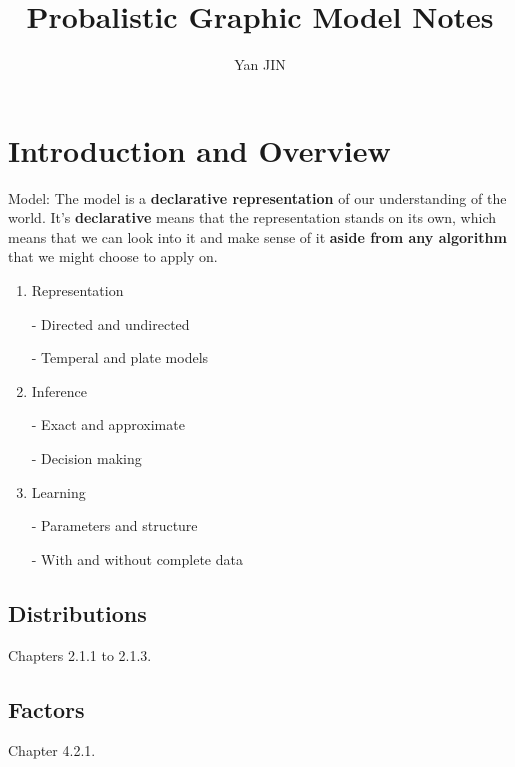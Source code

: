 \documentclass[12pt]{article}
\numberwithin{equation}{section}
\begin{document}
\small
  \renewcommand\figurename{Fig.}
    \title{Probalistic Graphic Model\cite{Coursera}\cite{koller2009probabilistic} Notes}
    \author{Yan JIN}
    \pagestyle{fancy}\fancyhf{}
    \lhead{}
    \lfoot{\textit{}}\cfoot{}\rfoot{\thepage}
    \renewcommand{\headrulewidth}{1.pt}
    \renewcommand{\footrulewidth}{1.pt}
  \maketitle
  
\tableofcontents
\newpage

\section{Introduction and Overview}
Model: The model is a \textbf{declarative representation} of our understanding of the world. It's \textbf{declarative} means that the representation stands on its own, which means that we can look into it and make sense of it \textbf{aside from any algorithm} that we might choose to apply on. 


\begin{enumerate}
	\item Representation
	
	- Directed and undirected
	
	- Temperal and plate models
	\item Inference
	
	- Exact and approximate
	
	- Decision making
	\item Learning
	
	- Parameters and structure
	
	- With and without complete data
\end{enumerate}

\subsection{Distributions}
Chapters 2.1.1 to 2.1.3.
\subsection{Factors}
Chapter 4.2.1.
\end{document}
